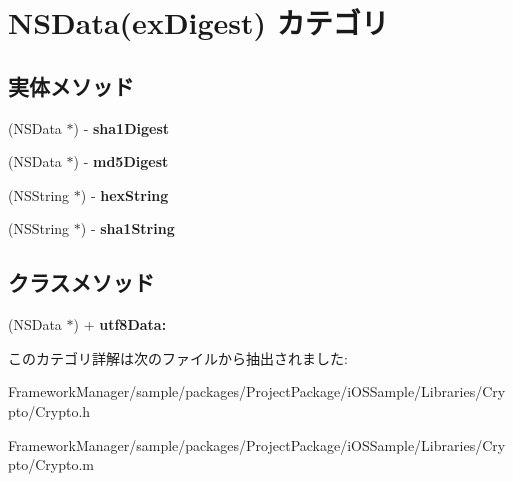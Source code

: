 \hypertarget{category_n_s_data_07ex_digest_08}{}\section{N\+S\+Data(ex\+Digest) カテゴリ}
\label{category_n_s_data_07ex_digest_08}
\subsection*{実体メソッド}
\begin{DoxyCompactItemize}
\item 
\hypertarget{category_n_s_data_07ex_digest_08_ab4a68241a41acb7f9616eee0314a5532}{}(N\+S\+Data $\ast$) -\/ {\bfseries sha1\+Digest}\label{category_n_s_data_07ex_digest_08_ab4a68241a41acb7f9616eee0314a5532}

\item 
\hypertarget{category_n_s_data_07ex_digest_08_a3f6ce0e17b938456d3f7e0ecd2515201}{}(N\+S\+Data $\ast$) -\/ {\bfseries md5\+Digest}\label{category_n_s_data_07ex_digest_08_a3f6ce0e17b938456d3f7e0ecd2515201}

\item 
\hypertarget{category_n_s_data_07ex_digest_08_a3afb304dd1fef166125f63a05b14ba07}{}(N\+S\+String $\ast$) -\/ {\bfseries hex\+String}\label{category_n_s_data_07ex_digest_08_a3afb304dd1fef166125f63a05b14ba07}

\item 
\hypertarget{category_n_s_data_07ex_digest_08_aead0dd2c8da1339da1515e097b03c033}{}(N\+S\+String $\ast$) -\/ {\bfseries sha1\+String}\label{category_n_s_data_07ex_digest_08_aead0dd2c8da1339da1515e097b03c033}

\end{DoxyCompactItemize}
\subsection*{クラスメソッド}
\begin{DoxyCompactItemize}
\item 
\hypertarget{category_n_s_data_07ex_digest_08_a34216531e0d36fa7d31984b0779ae9d3}{}(N\+S\+Data $\ast$) + {\bfseries utf8\+Data\+:}\label{category_n_s_data_07ex_digest_08_a34216531e0d36fa7d31984b0779ae9d3}

\end{DoxyCompactItemize}


このカテゴリ詳解は次のファイルから抽出されました\+:\begin{DoxyCompactItemize}
\item 
Framework\+Manager/sample/packages/\+Project\+Package/i\+O\+S\+Sample/\+Libraries/\+Crypto/Crypto.\+h\item 
Framework\+Manager/sample/packages/\+Project\+Package/i\+O\+S\+Sample/\+Libraries/\+Crypto/Crypto.\+m\end{DoxyCompactItemize}
